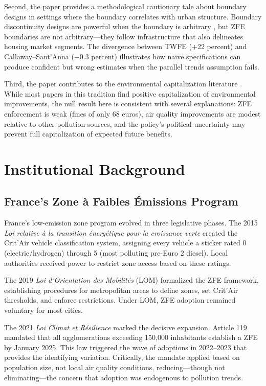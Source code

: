 \documentclass[12pt]{article}
\begin{document}
Second, the paper provides a methodological cautionary tale about boundary designs in settings where the boundary correlates with urban structure. Boundary discontinuity designs are powerful when the boundary is arbitrary \citep{black1999better}, but ZFE boundaries are not arbitrary---they follow infrastructure that also delineates housing market segments. The divergence between TWFE ($+$22 percent) and Callaway--Sant'Anna ($-$0.3 percent) illustrates how naive specifications can produce confident but wrong estimates when the parallel trends assumption fails.

Third, the paper contributes to the environmental capitalization literature \citep{chay2005does, currie2015environmental}. While most papers in this tradition find positive capitalization of environmental improvements, the null result here is consistent with several explanations: ZFE enforcement is weak (fines of only 68 euros), air quality improvements are modest relative to other pollution sources, and the policy's political uncertainty may prevent full capitalization of expected future benefits.



\section{Institutional Background} \label{sec:background}

\subsection{France's Zone \`a Faibles \'Emissions Program}

France's low-emission zone program evolved in three legislative phases. The 2015 \textit{Loi relative \`a la transition \'energ\'etique pour la croissance verte} created the Crit'Air vehicle classification system, assigning every vehicle a sticker rated 0 (electric/hydrogen) through 5 (most polluting pre-Euro 2 diesel). Local authorities received power to restrict zone access based on these ratings.

The 2019 \textit{Loi d'Orientation des Mobilit\'es} (LOM) formalized the ZFE framework, establishing procedures for metropolitan areas to define zones, set Crit'Air thresholds, and enforce restrictions. Under LOM, ZFE adoption remained voluntary for most cities.

The 2021 \textit{Loi Climat et R\'esilience} marked the decisive expansion. Article 119 mandated that all agglomerations exceeding 150,000 inhabitants establish a ZFE by January 2025. This law triggered the wave of adoptions in 2022--2023 that provides the identifying variation. Critically, the mandate applied based on population size, not local air quality conditions, reducing---though not eliminating---the concern that adoption was endogenous to pollution trends.
\end{document}
